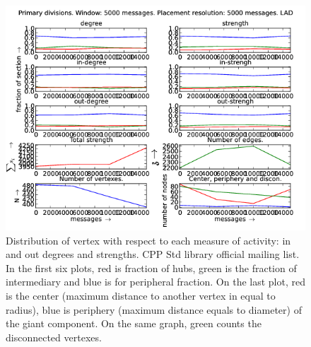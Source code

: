 \documentclass[%
 aip,
 jmp,%
 amsmath,amssymb,
 reprint,%
]{revtex4-1}
\begin{document}
\begin{figure}[hbtp] 
   \centering
        \includegraphics[width=\textwidth]{figs/LAD/5000}
    \caption{Distribution of vertex with respect to each measure of activity: in and out degrees and strengths. CPP Std library official mailing list. In the first six plots, red is fraction of hubs, green is the fraction of intermediary and blue is for peripheral fraction. On the last plot, red is the center (maximum distance to another vertex in equal to radius), blue is periphery (maximum distance equals to diameter) of the giant component. On the same graph, green counts the disconnected vertexes.}
    \label{fig:lad5000}
\end{figure}
\end{document}
